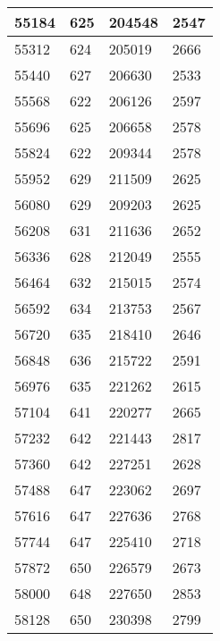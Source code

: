 \begin{longtable}{|l|l|l|l|}
		55184 & 625         & 204548          & 2547             \\ \hline
		55312 & 624         & 205019          & 2666             \\ \hline
		55440 & 627         & 206630          & 2533             \\ \hline
		55568 & 622         & 206126          & 2597             \\ \hline
		55696 & 625         & 206658          & 2578             \\ \hline
		55824 & 622         & 209344          & 2578             \\ \hline
		55952 & 629         & 211509          & 2625             \\ \hline
		56080 & 629         & 209203          & 2625             \\ \hline
		56208 & 631         & 211636          & 2652             \\ \hline
		56336 & 628         & 212049          & 2555             \\ \hline
		56464 & 632         & 215015          & 2574             \\ \hline
		56592 & 634         & 213753          & 2567             \\ \hline
		56720 & 635         & 218410          & 2646             \\ \hline
		56848 & 636         & 215722          & 2591             \\ \hline
		56976 & 635         & 221262          & 2615             \\ \hline
		57104 & 641         & 220277          & 2665             \\ \hline
		57232 & 642         & 221443          & 2817             \\ \hline
		57360 & 642         & 227251          & 2628             \\ \hline
		57488 & 647         & 223062          & 2697             \\ \hline
		57616 & 647         & 227636          & 2768             \\ \hline
		57744 & 647         & 225410          & 2718             \\ \hline
		57872 & 650         & 226579          & 2673             \\ \hline
		58000 & 648         & 227650          & 2853             \\ \hline
		58128 & 650         & 230398          & 2799             \\ \hline

\end{longtable}
